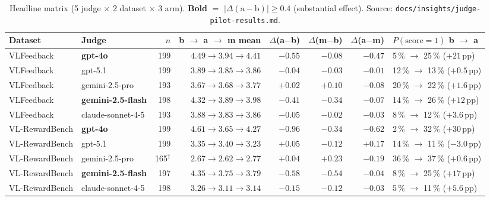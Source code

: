 \documentclass[11pt]{article}
\begin{document}
\begin{table}[h]
  \centering
  \small
  \begin{tabular}{llrrrrrl}
    \toprule
    \textbf{Dataset} & \textbf{Judge} & \textbf{$n$} & \textbf{b $\rightarrow$ a $\rightarrow$ m mean} & \textbf{$\Delta$(a$-$b)} & \textbf{$\Delta$(m$-$b)} & \textbf{$\Delta$(a$-$m)} & \textbf{$P(\text{score}{=}1)$ b $\rightarrow$ a} \\
    \midrule
    VLFeedback & \textbf{gpt-4o}              & 199 & $4.49 \rightarrow 3.94 \rightarrow 4.41$ & $\mathbf{-0.55}$ & $-0.08$ & $\mathbf{-0.47}$ & 5\,\% $\rightarrow$ 25\,\% ($+21$\,pp) \\
    VLFeedback & gpt-5.1                       & 199 & $3.89 \rightarrow 3.85 \rightarrow 3.86$ & $-0.04$           & $-0.03$ & $-0.01$           & 12\,\% $\rightarrow$ 13\,\% ($+0.5$\,pp) \\
    VLFeedback & gemini-2.5-pro                & 193 & $3.67 \rightarrow 3.68 \rightarrow 3.77$ & $+0.02$           & $+0.10$ & $-0.08$           & 20\,\% $\rightarrow$ 22\,\% ($+1.6$\,pp) \\
    VLFeedback & \textbf{gemini-2.5-flash}     & 198 & $4.32 \rightarrow 3.89 \rightarrow 3.98$ & $\mathbf{-0.41}$  & $-0.34$ & $-0.07$           & 14\,\% $\rightarrow$ 26\,\% ($+12$\,pp) \\
    VLFeedback & claude-sonnet-4-5             & 193 & $3.88 \rightarrow 3.83 \rightarrow 3.86$ & $-0.05$           & $-0.02$ & $-0.03$           & 8\,\% $\rightarrow$ 12\,\% ($+3.6$\,pp) \\
    VL-RewardBench & \textbf{gpt-4o}           & 199 & $4.61 \rightarrow 3.65 \rightarrow 4.27$ & $\mathbf{-0.96}$  & $-0.34$ & $\mathbf{-0.62}$  & 2\,\% $\rightarrow$ 32\,\% ($+30$\,pp) \\
    VL-RewardBench & gpt-5.1                   & 199 & $3.35 \rightarrow 3.40 \rightarrow 3.23$ & $+0.05$           & $-0.12$ & $+0.17$           & 14\,\% $\rightarrow$ 11\,\% ($-3.0$\,pp) \\
    VL-RewardBench & gemini-2.5-pro            & 165$^\dagger$ & $2.67 \rightarrow 2.62 \rightarrow 2.77$ & $+0.04$ & $+0.23$ & $-0.19$           & 36\,\% $\rightarrow$ 37\,\% ($+0.6$\,pp) \\
    VL-RewardBench & \textbf{gemini-2.5-flash} & 197 & $4.35 \rightarrow 3.75 \rightarrow 3.79$ & $\mathbf{-0.58}$  & $-0.54$ & $-0.04$           & 8\,\% $\rightarrow$ 25\,\% ($+17$\,pp) \\
    VL-RewardBench & claude-sonnet-4-5         & 198 & $3.26 \rightarrow 3.11 \rightarrow 3.14$ & $-0.15$           & $-0.12$ & $-0.03$           & 5\,\% $\rightarrow$ 11\,\% ($+5.6$\,pp) \\
    \bottomrule
  \end{tabular}
  \caption{Headline matrix (5 judge $\times$ 2 dataset $\times$ 3 arm). \textbf{Bold} $=$ $|\Delta(\text{a}-\text{b})| \geq 0.4$ (substantial effect). Source: \texttt{docs/insights/judge-pilot-results.md}.}
  \label{tab:judge-headline}
\end{table}
\end{document}
